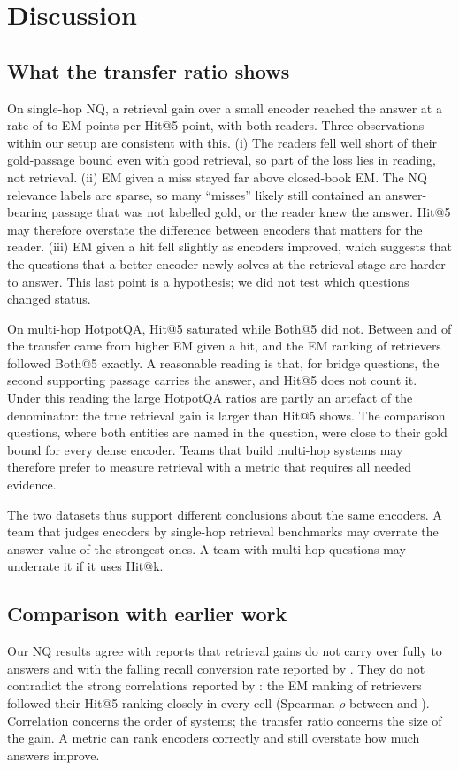 \section{Discussion}\label{sec:discussion}

\subsection{What the transfer ratio shows}
On single-hop NQ, a retrieval gain over a small encoder reached the answer at a rate of  to  EM points per Hit@5 point, with both readers. Three observations within our setup are consistent with this. (i) The readers fell well short of their gold-passage bound even with good retrieval, so part of the loss lies in reading, not retrieval. (ii) EM given a miss stayed far above closed-book EM. The NQ relevance labels are sparse, so many ``misses'' likely still contained an answer-bearing passage that was not labelled gold, or the reader knew the answer. Hit@5 may therefore overstate the difference between encoders that matters for the reader. (iii) EM given a hit fell slightly as encoders improved, which suggests that the questions that a better encoder newly solves at the retrieval stage are harder to answer. This last point is a hypothesis; we did not test which questions changed status.

On multi-hop HotpotQA, Hit@5 saturated while Both@5 did not. Between  and  of the transfer came from higher EM given a hit, and the EM ranking of retrievers followed Both@5 exactly. A reasonable reading is that, for bridge questions, the second supporting passage carries the answer, and Hit@5 does not count it. Under this reading the large HotpotQA ratios are partly an artefact of the denominator: the true retrieval gain is larger than Hit@5 shows. The comparison questions, where both entities are named in the question, were close to their gold bound for every dense encoder. Teams that build multi-hop systems may therefore prefer to measure retrieval with a metric that requires all needed evidence.

The two datasets thus support different conclusions about the same encoders. A team that judges encoders by single-hop retrieval benchmarks may overrate the answer value of the strongest ones. A team with multi-hop questions may underrate it if it uses Hit@k.

\subsection{Comparison with earlier work}
Our NQ results agree with reports that retrieval gains do not carry over fully to answers \citep{salemi2024erag,mathur2026policy,ghosh2026evidence} and with the falling recall conversion rate reported by \citet{peng2026neocorrag}. They do not contradict the strong correlations reported by \citet{samuel2026beyond}: the EM ranking of retrievers followed their Hit@5 ranking closely in every cell (Spearman $\rho$ between  and ). Correlation concerns the order of systems; the transfer ratio concerns the size of the gain. A metric can rank encoders correctly and still overstate how much answers improve.

